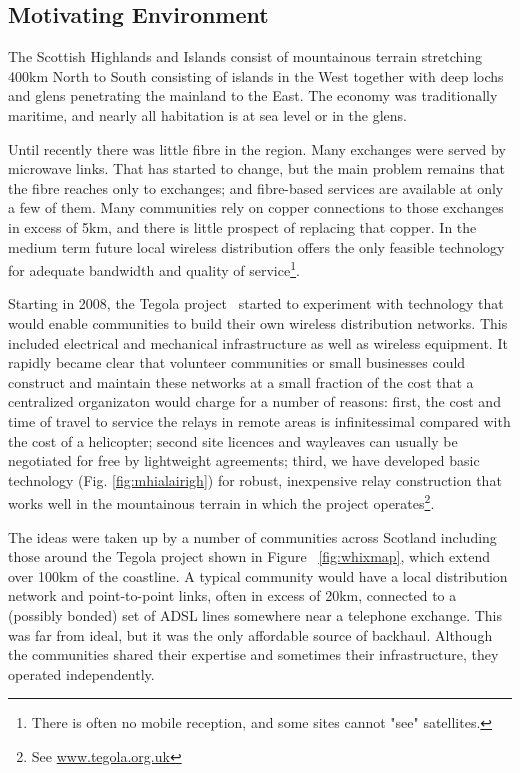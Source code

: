\subsection{Motivating Environment}
The Scottish Highlands and Islands consist of mountainous terrain
stretching 400km North to South consisting of islands in the West
together with deep lochs and glens penetrating the mainland to the
East.  The economy was traditionally maritime, and nearly all
habitation is at sea level or in the glens.

Until recently there was little fibre in the region.  Many exchanges
were served by microwave links. That has started to change, but the
main problem remains that the fibre reaches only to exchanges; and
fibre-based services are available at only a few of them.  Many
communities rely on copper connections to those exchanges in excess of
5km, and there is little prospect of replacing that copper.  In the
medium term future local wireless distribution offers the only
feasible technology for adequate bandwidth and quality of
service\footnote{There is often no mobile reception, and some sites
  cannot "see" satellites.}.

Starting in 2008, the Tegola project~\cite{tegola} started to
experiment with technology that would enable communities to build
their own wireless distribution networks.  This included electrical
and mechanical infrastructure as well as wireless equipment.  It
rapidly became clear that volunteer communities or small businesses
could construct and maintain these networks at a small fraction of the
cost that a centralized organizaton would charge for a number of
reasons: first, the cost and time of travel to service the relays in
remote areas is infinitessimal compared with the cost of a helicopter;
second site licences and wayleaves can usually be negotiated for free
by lightweight agreements; third, we have developed basic technology
(Fig. \ref{fig:mhialairigh}) for robust, inexpensive relay
construction that works well in the mountainous terrain in which the
project operates\footnote{See \url{www.tegola.org.uk}}.

The ideas were taken up by a number of communities across Scotland
including those around the Tegola project shown in Figure
~\ref{fig:whixmap}, which extend over 100km of the coastline. A
typical community would have a local distribution network and
point-to-point links, often in excess of 20km, connected to a
(possibly bonded) set of ADSL lines somewhere near a telephone
exchange. This was far from ideal, but it was the only affordable
source of backhaul. Although the communities shared their expertise
and sometimes their infrastructure, they operated independently.

